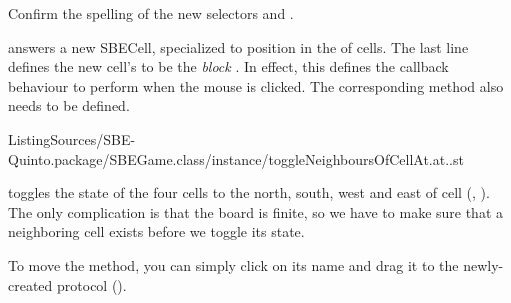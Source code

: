 \documentclass[a4paper,10pt,twoside]{book}
\begin{document}
Confirm the spelling of the new selectors  and .

 answers a new SBECell, specialized to position  in the  of cells.
The last line defines the new cell's  to be the \emph{block}
\mbox{.}
 In effect, this defines the callback behaviour to perform when the mouse is clicked.
The corresponding method also needs to be defined.

%
{ListingSources/SBE-Quinto.package/SBEGame.class/instance/toggleNeighboursOfCellAt.at..st}

 toggles the state of the four cells to the north, south, west and east of cell (, ).  The only complication is that the board is finite, so we have to make sure that a neighboring cell exists before we toggle its state.

To move the method, you can simply click on its name and drag it to the newly-created protocol ().
\end{document}
